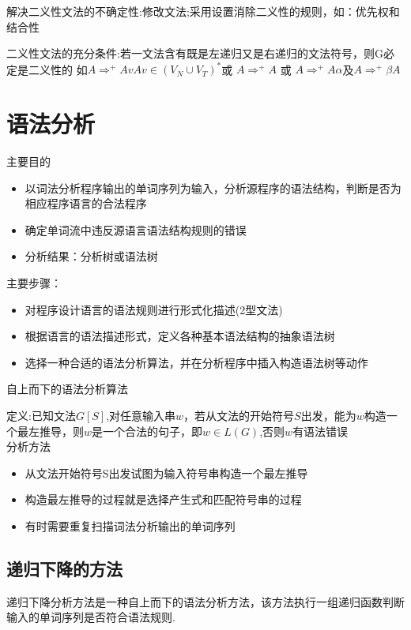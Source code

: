 \documentclass[utf8]{ctexart}
\begin{document}
解决二义性文法的不确定性:修改文法;采用设置消除二义性的规则，如：优先权和结合性

二义性文法的充分条件:若一文法含有既是左递归又是右递归的文法符号，则G必定是二义性的
如$A \Rightarrow ^+ AvA v \in (V_N \cup V_T)^*$或 $A \Rightarrow ^+ A$ 或 $A \Rightarrow ^+ A\alpha$及$A \Rightarrow ^+ \beta A$


\section{语法分析}

\noindent 主要目的
\begin{itemize}
    \item 以词法分析程序输出的单词序列为输入，分析源程序的语法结构，判断是否为相应程序语言的合法程序
    \item 确定单词流中违反源语言语法结构规则的错误
    \item 分析结果：分析树或语法树
\end{itemize}

\noindent 主要步骤：
\begin{itemize}
    \item 对程序设计语言的语法规则进行形式化描述(2型文法)
    \item 根据语言的语法描述形式，定义各种基本语法结构的抽象语法树
    \item 选择一种合适的语法分析算法，并在分析程序中插入构造语法树等动作
\end{itemize}

\noindent 自上而下的语法分析算法

定义:已知文法$G[S]$,对任意输入串$w$，若从文法的开始符号$S$出发，能为$w$构造一个最左推导，则$w$是一个合法的句子，即$w \in L(G)$,否则$w$有语法错误
\\
\noindent 分析方法
\begin{itemize}
    \item 从文法开始符号S出发试图为输入符号串构造一个最左推导
    \item 构造最左推导的过程就是选择产生式和匹配符号串的过程
    \item 有时需要重复扫描词法分析输出的单词序列
\end{itemize}

\subsection{递归下降的方法}
递归下降分析方法是一种自上而下的语法分析方法，该方法执行一组递归函数判断输入的单词序列是否符合语法规则.
\end{document}
